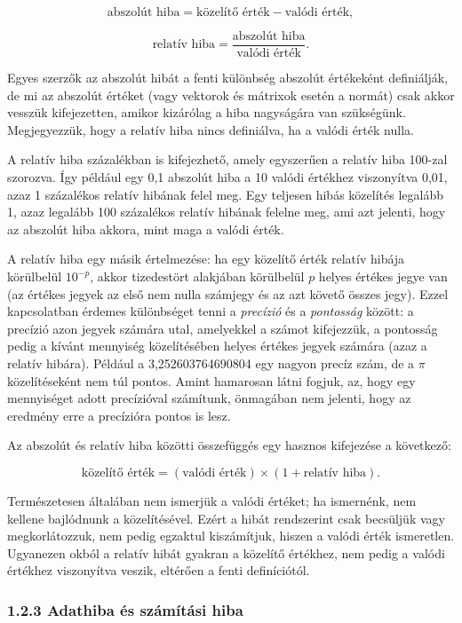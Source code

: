 \documentclass[
  magyar,
  11pt]{article}
\begin{document}
\[\text{abszolút hiba} = \text{közelítő érték} - \text{valódi érték},\]

\[\text{relatív hiba} = \frac{\text{abszolút hiba}}{\text{valódi érték}}.\]

Egyes szerzők az abszolút hibát a fenti különbség abszolút értékeként
definiálják, de mi az abszolút értéket (vagy vektorok és mátrixok esetén
a normát) csak akkor vesszük kifejezetten, amikor kizárólag a hiba
nagyságára van szükségünk. Megjegyezzük, hogy a relatív hiba nincs
definiálva, ha a valódi érték nulla.

A relatív hiba százalékban is kifejezhető, amely egyszerűen a relatív
hiba 100-zal szorozva. Így például egy 0,1 abszolút hiba a 10 valódi
értékhez viszonyítva 0,01, azaz 1 százalékos relatív hibának felel meg.
Egy teljesen hibás közelítés legalább 1, azaz legalább 100 százalékos
relatív hibának felelne meg, ami azt jelenti, hogy az abszolút hiba
akkora, mint maga a valódi érték.

A relatív hiba egy másik értelmezése: ha egy közelítő érték relatív
hibája körülbelül \(10^{-p}\), akkor tizedestört alakjában körülbelül
\(p\) helyes értékes jegye van (az értékes jegyek az első nem nulla
számjegy és az azt követő összes jegy). Ezzel kapcsolatban érdemes
különbséget tenni a \emph{precízió} és a \emph{pontosság} között: a
precízió azon jegyek számára utal, amelyekkel a számot kifejezzük, a
pontosság pedig a kívánt mennyiség közelítésében helyes értékes jegyek
számára (azaz a relatív hibára). Például a 3,252603764690804 egy nagyon
precíz szám, de a \(\pi\) közelítéseként nem túl pontos. Amint hamarosan
látni fogjuk, az, hogy egy mennyiséget adott precízióval számítunk,
önmagában nem jelenti, hogy az eredmény erre a precízióra pontos is
lesz.

Az abszolút és relatív hiba közötti összefüggés egy hasznos kifejezése a
következő:

\[\text{közelítő érték} = (\text{valódi érték}) \times (1 + \text{relatív hiba}).\]

Természetesen általában nem ismerjük a valódi értéket; ha ismernénk, nem
kellene bajlódnunk a közelítésével. Ezért a hibát rendszerint csak
becsüljük vagy megkorlátozzuk, nem pedig egzaktul kiszámítjuk, hiszen a
valódi érték ismeretlen. Ugyanezen okból a relatív hibát gyakran a
közelítő értékhez, nem pedig a valódi értékhez viszonyítva veszik,
eltérően a fenti definíciótól.

\subsubsection{1.2.3 Adathiba és számítási
hiba}\label{adathiba-uxe9s-szuxe1muxedtuxe1si-hiba}
\end{document}
